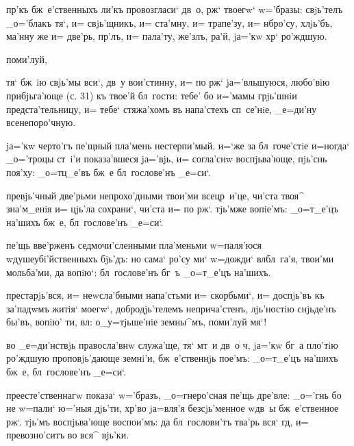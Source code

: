    пр'къ бж~е'ственныхъ ли'къ 
провозгласи` дв~о, рж` твоегw` w='бразы: свjь'телъ 
_о='блакъ тя`, и= свjь'щникъ, и= ста'мну, и= трапе'зу, и= 
нб ро'су, хлjь'бъ, ма'нну же и= две'рь, пр'лъ, 
и= пала'ту, же'злъ, ра'й, jа='кw хр` ро'ждшую.

 поми'луй, 

    тя` бж~iю свjь'мы вси`, 
дв~у вои'стинну, и= по рж` jа='вльшуюся, любо'вiю 
прибjьга'юще (с. 31) къ твое'й бл~гости: тебе' бо и='мамы 
грjь'шнiи предста'тельницу, и= тебе` стяжа'хомъ въ 
напа'стехъ сп~се'нiе, _е=ди'ну всенепоро'чную.


 jа='кw черто'гъ пе'щный пла'мень 
нестерпи'мый, и=`же за бл~гоче'стiе и=ногда` _о='троцы 
ст~i'и показа'вшеся jа='вjь, и= согла'снw воспjьва'юще, 
пjь'снь поя'ху: _о=тц_е'въ бж~е бл~гослове'нъ _е=си`.

 превjь'чный две'рьми непрохо'дными твои'ми 
всецр~и'це, чи'ста твоя^ зна'м_енiя и= цjь'ла сохрани`, 
чи'ста и= по рж`. тjь'мже вопiе'мъ: _о=т_е'цъ 
на'шихъ бж~е, бл~гослове'нъ _е=си`.

 пе'щь вве'рженъ седмочи'сленными пла'меньми 
w=паля'юся w\т душеубi'йственныхъ бjь'дъ: но сама` ро'су 
ми` w=дожди` вл бл~га'я, твои'ми мольба'ми, да 
вопiю`: бл~гослове'нъ бг~ъ _о=т_е'цъ на'шихъ.

  престарjь'вся, и= неwсла'бными 
напа'стьми и= скорбьми`, и= доспjь'въ къ за'падwмъ житiя` 
моегw`, добродjь'телемъ неприча'стенъ, лjь'ностiю 
снjьде'нъ бы'въ, вопiю' ти, вл: о_у=тjьше'нiе 
земны^мъ, поми'луй мя`!

   во _е=ди'нствjь правосла'внw 
служа'ще, тя` мт~и дв~о ч, jа='кw бг~а пло'тiю 
ро'ждшую проповjь'дающе земнi'и, бж~е'ственнjь пое'мъ: 
_о=т_е'цъ на'шихъ бж~е, бл~гослове'нъ _е=си`.


  преесте'ственнагw показа` w='бразъ, 
_о=гнеро'сная пе'щь дре'вле: _о='гнь бо не w=пали` ю='ныя 
дjь'ти, хр'во jа=вля'я безсjь'менное w\т дв~ы 
бж~е'ственное рж`. тjь'мъ воспjьва'юще воспои'мъ: да 
бл~гослови'тъ тва'рь вся` гд, и= превозно'ситъ во вся^ 
вjь'ки.

